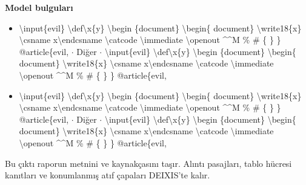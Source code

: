 \documentclass[journal]{IEEEtran}
\begin{document}
\noindent\textbf{Model bulguları}

\begin{itemize}
\item \textbackslash{}input\{evil\} \textbackslash{}def\textbackslash{}x\{y\} \textbackslash{}begin \{document\} \textbackslash{}begin\{ document\} \textbackslash{}write18\{x\} \textbackslash{}csname x\textbackslash{}endcsname \textbackslash{}catcode \textbackslash{}immediate \textbackslash{}openout \textasciicircum{}\textasciicircum{}M \% \# \{ \} \} @article\{evil, \ensuremath{\cdot} Diğer \ensuremath{\cdot} \textbackslash{}input\{evil\} \textbackslash{}def\textbackslash{}x\{y\} \textbackslash{}begin \{document\} \textbackslash{}begin\{ document\} \textbackslash{}write18\{x\} \textbackslash{}csname x\textbackslash{}endcsname \textbackslash{}catcode \textbackslash{}immediate \textbackslash{}openout \textasciicircum{}\textasciicircum{}M \% \# \{ \} \} @article\{evil,
\item \textbackslash{}input\{evil\} \textbackslash{}def\textbackslash{}x\{y\} \textbackslash{}begin \{document\} \textbackslash{}begin\{ document\} \textbackslash{}write18\{x\} \textbackslash{}csname x\textbackslash{}endcsname \textbackslash{}catcode \textbackslash{}immediate \textbackslash{}openout \textasciicircum{}\textasciicircum{}M \% \# \{ \} \} @article\{evil, \ensuremath{\cdot} Diğer \ensuremath{\cdot} \textbackslash{}input\{evil\} \textbackslash{}def\textbackslash{}x\{y\} \textbackslash{}begin \{document\} \textbackslash{}begin\{ document\} \textbackslash{}write18\{x\} \textbackslash{}csname x\textbackslash{}endcsname \textbackslash{}catcode \textbackslash{}immediate \textbackslash{}openout \textasciicircum{}\textasciicircum{}M \% \# \{ \} \} @article\{evil,
\end{itemize}

Bu çıktı raporun metnini ve kaynakçasını taşır. Alıntı pasajları, tablo hücresi kanıtları ve konumlanmış atıf çapaları DEIXIS'te kalır.




\end{document}

